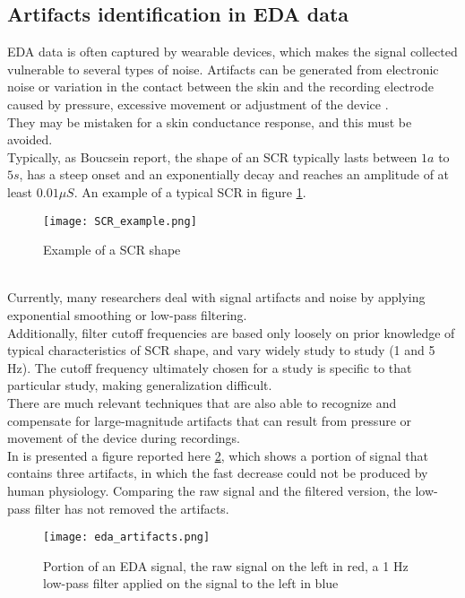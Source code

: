 \subsection{Artifacts identification in EDA data}
EDA data is often captured by wearable devices, which makes the signal collected vulnerable to several types of noise. Artifacts can be generated from electronic noise or variation in the contact between the skin and the recording electrode caused by pressure, excessive movement or adjustment of the device \cite{taylor2015automatic}.
\\
They may be mistaken for a skin conductance response, and this must be avoided.
\\ \indent
Typically, as Boucsein \cite{boucsein2012electrodermal} report, the shape of an SCR typically lasts between $1a$ to $5s$, has a steep onset and an exponentially decay and reaches an amplitude of at least $0.01 \mu S$. An example of a typical SCR in figure \ref{fig:SCR_example}.
\begin{figure}[h]
    \centering
    \texttt{[image: SCR\_example.png]} 
	\caption{Example of a SCR shape}
    \label{fig:SCR_example}
\end{figure}
\\
Currently, many researchers deal with signal artifacts and noise by applying exponential smoothing or low-pass filtering.
\\
Additionally, filter cutoff frequencies are based only loosely on prior knowledge of typical characteristics of SCR shape, and vary widely study to study (1 and 5 Hz). The cutoff frequency ultimately chosen for a study is specific to that particular study, making generalization difficult.
\\ \indent
There are much relevant techniques that are also able to recognize and compensate for large-magnitude artifacts that can result from pressure or movement of the device during recordings.
\\
In \cite{taylor2015automatic} is presented a figure reported here \ref{fig:eda_artifacts}, which shows a portion of signal that contains three artifacts, in which the fast decrease could not be produced by human physiology. Comparing the raw signal and the filtered version, the low-pass filter has not removed the artifacts.
\begin{figure}[h]
    \centering
    \texttt{[image: eda\_artifacts.png]} 
	\caption{Portion of an EDA signal, the raw signal on the left in red, a 1 Hz low-pass filter applied on the signal to the left in blue}
    \label{fig:eda_artifacts}
\end{figure}

